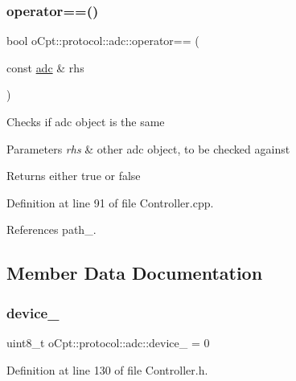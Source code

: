 \subsubsection{\texorpdfstring{operator==()}{operator==()}}
{\footnotesize\ttfamily bool o\+Cpt\+::protocol\+::adc\+::operator== (\begin{DoxyParamCaption}\item[{const \hyperlink{classo_cpt_1_1protocol_1_1adc}{adc} \&}]{rhs }\end{DoxyParamCaption})}

Checks if adc object is the same 
\begin{DoxyParams}{Parameters}
{\em rhs} & other adc object, to be checked against \\
\hline
\end{DoxyParams}
\begin{DoxyReturn}{Returns}
either true or false 
\end{DoxyReturn}


Definition at line 91 of file Controller.\+cpp.



References path\+\_\+.



\subsection{Member Data Documentation}
\hypertarget{classo_cpt_1_1protocol_1_1adc_a0781bbf803cff1a30fb79bc2118ee771}{}\label{classo_cpt_1_1protocol_1_1adc_a0781bbf803cff1a30fb79bc2118ee771} 
\subsubsection{\texorpdfstring{device\+\_\+}{device\_}}
{\footnotesize\ttfamily uint8\+\_\+t o\+Cpt\+::protocol\+::adc\+::device\+\_\+ = 0\hspace{0.3cm}{\ttfamily [private]}}



Definition at line 130 of file Controller.\+h.

\hypertarget{classo_cpt_1_1protocol_1_1adc_a1ea5bd6df6c5163f98dd097796afddb7}{}\label{classo_cpt_1_1protocol_1_1adc_a1ea5bd6df6c5163f98dd097796afddb7} 

